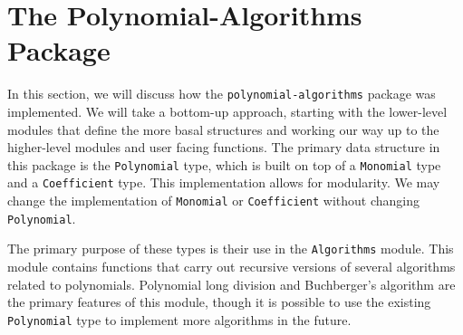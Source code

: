 \documentclass[MS, xcolor=dvipsnames]{wfuthesis}
\theoremstyle{definition}
\begin{document}
\chapter{The Polynomial-Algorithms Package}
In this section, we will discuss how the \lstinline{polynomial-algorithms} package was implemented. We will take a bottom-up approach, starting with the lower-level modules that define the more basal structures and working our way up to the higher-level modules and user facing functions. The primary data structure in this package is the \lstinline{Polynomial} type, which is built on top of a \lstinline{Monomial} type and a \lstinline{Coefficient} type. This implementation allows for modularity. We may change the implementation of \lstinline{Monomial} or \lstinline{Coefficient} without changing \lstinline{Polynomial}. \par
The primary purpose of these types is their use in the \lstinline{Algorithms} module. This module contains functions that carry out recursive versions of several algorithms related to polynomials. Polynomial long division and Buchberger's algorithm are the primary features of this module, though it is possible to use the existing \lstinline{Polynomial} type to implement more algorithms in the future.

\end{document}
